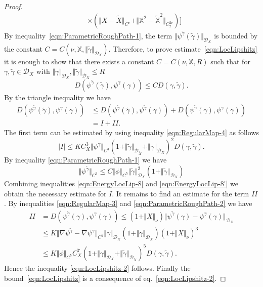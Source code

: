 \documentclass[11pt,a4paper,reqno]{amsart}%
\theoremstyle{plain}
\theoremstyle{remark}
\theoremstyle{plain}
\numberwithin{equation}{section}
\begin{document}
\begin{proof}
\begin{align*}
&\times(\Vert X-\tilde{X}\Vert_{C^{\nu}}+\Vert \mathbb{X}^2-\mathbb{\tilde{X}}^2\Vert_{C_2^{2\nu}})\Big]
\end{align*}
By
inequality~\eqref{eqn:ParametricRoughPath-1}, the term $\Vert \psi^{\tilde{\gamma}}(\tilde{\gamma})\Vert_{\mathcal{D}_X}$ is
bounded by the constant
$C=C(\nu,\mathbb{X},\Vert \tilde{\gamma}\Vert_{\mathcal{D}_X})$. Therefore, to prove
estimate~\eqref{eqn:LocLipshitz} it is enough to show that there
exists a constant $C=C(\nu,\mathbb{X},R)$ such that for
$\gamma,\tilde{\gamma}\in\mathcal{D}_X$ with
$\Vert \gamma\Vert_{\mathcal{D}_X},\Vert \tilde{\gamma}\Vert_{\mathcal{D}_X}\leq R$
\begin{equation}
D( \psi^{\tilde{\gamma}}(\tilde{\gamma}), \psi^{\gamma}(\gamma)) \leq
CD( \gamma,\tilde{\gamma}).\label{eqn:EnergyLocLip-6}
\end{equation}
By the triangle inequality we have
\begin{align}
D( \psi^{\tilde{\gamma}}(\tilde{\gamma}), \psi^{\gamma}(\gamma))
&\leq D( \psi^{\tilde{\gamma}}(\tilde{\gamma}), \psi^{\tilde{\gamma}}(\gamma)) + D( \psi^{\tilde{\gamma}}({\gamma}), \psi^{\gamma}(\gamma))
\nonumber\\
&=I+II.\label{eqn:EnergyLocLip-7}
\end{align}
The first term can be estimated by using inequality
\eqref{eqn:RegularMap-4} as follows
\begin{equation}
\vert I\vert \leq
KC_X^3\Vert \psi^{\tilde{\gamma}}\Vert_{C^3}(1+\Vert \tilde{\gamma}\Vert_{\mathcal{D}_{\tilde{X}}}+
\Vert \gamma\Vert_{\mathcal{D}_X})^2 D( \gamma,\tilde{\gamma}).\label{eqn:EnergyLocLip-8}
\end{equation}
By inequality \eqref{eqn:ParametricRoughPath-1} we have
\begin{equation}
\Vert \psi^{\tilde{\gamma}}\Vert_{C^3}\leq
C\Vert \phi\Vert_{C^5}\Vert \tilde{\gamma}\Vert_{\mathcal{D}_X}^2(1+\Vert \tilde{\gamma}\Vert_{\mathcal{D}_X})\label{eqn:EnergyLocLip-8'}
\end{equation}
Combining inequalities \eqref{eqn:EnergyLocLip-8} and
\eqref{eqn:EnergyLocLip-8'} we obtain the necessary estimate for $I$. It
remains to find an estimate for the term $II$. By inequalities
\eqref{eqn:RegularMap-3} and \eqref{eqn:ParametricRoughPath-2} we
have
\begin{align}
II&=D( \psi^{\tilde{\gamma}}({\gamma}), \psi^{\gamma}(\gamma))
\leq
(1+\Vert X\Vert_{\nu})\Vert \psi^{\tilde{\gamma}}(\gamma)-\psi^{\gamma}(\gamma)\Vert_{\mathcal{D}_X}\nonumber\\
&\leq K\Vert \nabla\psi^{\tilde{\gamma}}-\nabla\psi^{\gamma}\Vert_{C^1}
\Vert \gamma\Vert_{\mathcal{D}_X}(1+\Vert \gamma\Vert_{\mathcal{D}_X})(1+\Vert X\Vert_{\nu})^3
\nonumber\\
&\leq K\Vert \phi\Vert_{C^5}C_X^7(1+\Vert \gamma\Vert_{\mathcal{D}_X}+\Vert \tilde{\gamma}\Vert_{\mathcal{D}_{\tilde{X}}})^5
D( \gamma,\tilde{\gamma}).\label{eqn:EnergyLocLip-9}
\end{align}
Hence the inequality \eqref{eqn:LocLipshitz-2} follows. Finally the bound~\eqref{eqn:LocLipshitz} is a consequence of eq.~\eqref{eqn:LocLipshitz-2}.
\end{proof}
\end{document}
